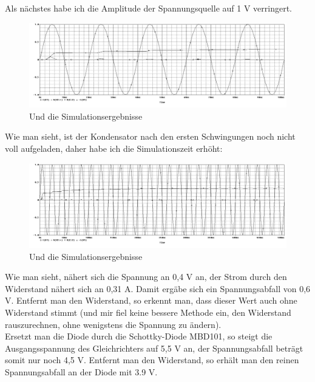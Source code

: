 Als nächstes habe ich die Amplitude der Spannungsquelle auf 1 V verringert.
\begin{figure}[H]
	\centering
	\includegraphics[width=\linewidth]{versuch2/spice/v2_5_4_simulation.png}
	\caption{Und die Simulationsergebnisse}
\end{figure}
Wie man sieht, ist der Kondensator nach den ersten Schwingungen noch nicht voll aufgeladen, daher habe ich die Simulationszeit erhöht:
\begin{figure}[H]
	\centering
	\includegraphics[width=\linewidth]{versuch2/spice/v2_5_4_2_simulation.png}
	\caption{Und die Simulationsergebnisse}
\end{figure}
Wie man sieht, nähert sich die Spannung an 0,4 V an, der Strom durch den Widerstand nähert sich an 0,31 A. Damit ergäbe sich ein Spannungsabfall von 0,6 V. Entfernt man den Widerstand, so erkennt man, dass dieser Wert auch ohne Widerstand stimmt (und mir fiel keine bessere Methode ein, den Widerstand rauszurechnen, ohne wenigstens die Spannung zu ändern).\\
Ersetzt man die Diode durch die Schottky-Diode MBD101, so steigt die Ausgangsspannung des Gleichrichters auf 5,5 V an, der Spannungsabfall beträgt somit nur noch 4,5 V. Entfernt man den Widerstand, so erhält man den reinen Spannungsabfall an der Diode mit 3.9 V.

